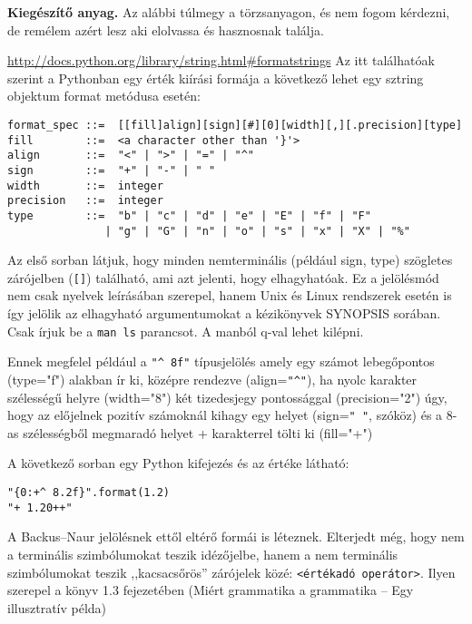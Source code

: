\documentclass[a4paper]{article}
\begin{document}
\begin{leftbar}
\small
\textbf{Kiegészítő anyag.}
Az alábbi túlmegy a törzsanyagon, és nem fogom kérdezni, de remélem azért lesz
aki elolvassa és hasznosnak találja.

\url{http://docs.python.org/library/string.html#formatstrings} Az itt
találhatóak szerint a Pythonban egy érték kiírási formája a következő lehet egy
sztring objektum format metódusa esetén:

\begin{verbatim}
format_spec ::=  [[fill]align][sign][#][0][width][,][.precision][type]
fill        ::=  <a character other than '}'>
align       ::=  "<" | ">" | "=" | "^"
sign        ::=  "+" | "-" | " "
width       ::=  integer
precision   ::=  integer
type        ::=  "b" | "c" | "d" | "e" | "E" | "f" | "F"
               | "g" | "G" | "n" | "o" | "s" | "x" | "X" | "%"
\end{verbatim}

Az első sorban látjuk, hogy minden nemterminális (például sign, type) szögletes
zárójelben (\verb+[]+) található, ami azt jelenti, hogy elhagyhatóak.
{\footnotesize Ez a jelölésmód nem csak nyelvek leírásában szerepel, hanem Unix
és Linux rendszerek esetén is így jelölik az elhagyható argumentumokat a
kézikönyvek SYNOPSIS sorában. Csak írjuk be a \texttt{man ls} parancsot.
\scriptsize A manból q-val lehet kilépni.}

Ennek megfelel például a \verb+"^ 8f"+ típusjelölés amely egy számot lebegőpontos
(type="f") alakban ír ki, középre rendezve (align=\verb+"^"+), ha nyolc
karakter szélességű helyre (width="8") két tizedesjegy pontossággal
(precision="2") úgy, hogy az előjelnek pozitív számoknál kihagy egy helyet
(sign=\verb'" "', szóköz) és a 8-as szélességből megmaradó helyet + karakterrel
tölti ki (fill="+")

A következő sorban egy Python kifejezés és az értéke látható:
\begin{verbatim}
"{0:+^ 8.2f}".format(1.2)
"+ 1.20++"
\end{verbatim}
\end{leftbar}

A Backus--Naur jelölésnek ettől eltérő formái is léteznek. {\small Elterjedt
még, hogy nem a terminális szimbólumokat teszik idézőjelbe, hanem a nem
terminális szimbólumokat teszik ,,kacsacsőrös'' zárójelek közé:
\verb+<értékadó operátor>+. Ilyen szerepel a könyv
1.3 fejezetében (Miért grammatika a grammatika -- Egy illusztratív
példa)}
\end{document}
